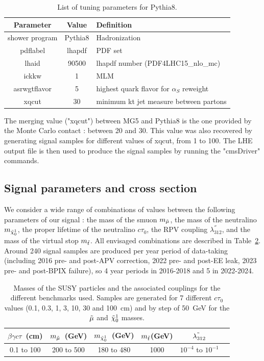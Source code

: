 \documentclass{cernatlasnote}
\begin{document}
\begin{appendices}
\begin{table}[h]
\centering
\caption{List of tuning parameters for Pythia8.}
\label{TAB : GENPARA}
\smallskip
\begin{tabular}{ ccl } 
    Parameter & Value & Definition\\
    \hline 
    shower program & Pythia8 & Hadronization \\
    pdflabel & lhapdf & PDF set  \\ 
    lhaid & 90500 & lhapdf number (PDF4LHC15\_nlo\_mc)\\
    ickkw & 1 & MLM \\
    asrwgtflavor & 5 & highest quark flavor for $\alpha_{S}$ reweight \\
    xqcut & 30 & minimum kt jet measure between partons \\
\end{tabular}
\end{table}

The merging value ("xqcut") between MG5 and Pythia8 is the one provided by the Monte Carlo contact : between 20 and 30. This value was also recovered by generating signal samples for different values of xqcut, from 1 to 100. The LHE output file is then used to produce the signal samples by running the "cmsDriver" commands.

\subsection{Signal parameters and cross section}
We consider a wide range of combinations of values between the following parameters of our signal :
the mass of the smuon $m_{\Tilde{\mu}}$, the mass of the neutralino $m_{\Tilde{\chi}_{0}^{1}}$, the proper lifetime of the neutralino $c\tau_{0}$, the RPV coupling $\lambda^{''}_{312}$, and the mass of the virtual stop $m_{\Tilde{t}}$. All envisaged combinations are described in Table~\ref{tab:TAB1}. Around 240 signal samples are produced per year period of data-taking (including 2016 pre- and post-APV correction, 2022 pre- and post-EE leak, 2023 pre- and post-BPIX failure), so 4 year periods in 2016-2018 and 5 in 2022-2024.

\begin{table}[h]
\centering
   \caption{Masses of the SUSY particles and the associated couplings for the different benchmarks used. Samples are generated for 7 different $c\tau_{0}$ values (0.1, 0.3, 1, 3, 10, 30 and 100~cm) and by step of 50~GeV for the $\Tilde{\mu}$ and $\Tilde{\chi}_{0}^{1}$ masses.}
   \label{tab:TAB1}
   \smallskip
\begin{tabular}{cccccc}
  $\beta\gamma c\tau$~(cm) & $m_{\Tilde{\mu}}$~(GeV) &  $m_{\Tilde{\chi}_{0}^{1}}$~(GeV) &  $m_{\Tilde{t}}$(GeV) &  $\lambda^{"}_{312}$ \\
  \hline
  0.1 to 100 & 200 to 500  & 180 to 480  & 1000 &  $10^{-4}$ to $10^{-1}$ \\
\end{tabular}
\end{table}
 

\end{appendices}
\end{document}
